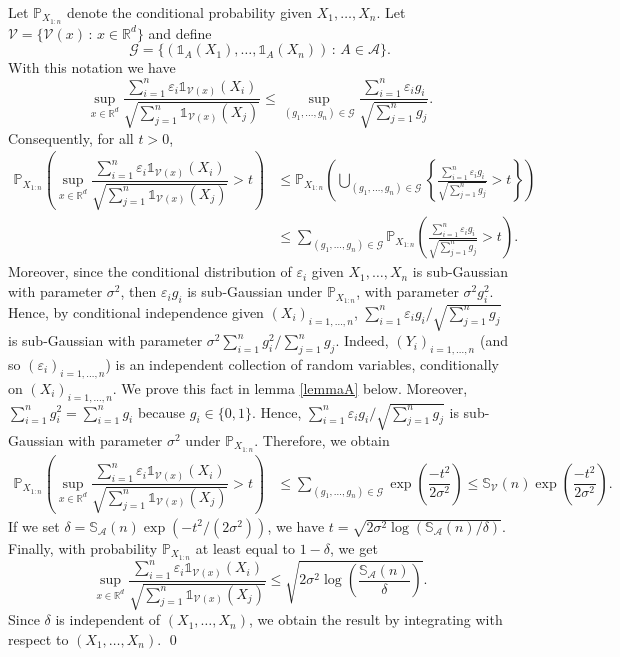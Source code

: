 \documentclass[paper=a4, fontsize=11pt]{scrartcl}
\newcommand{\pr}{\mathbb{P}}
\begin{document}
Let \( \mathbb P_{X_{1:n}} \) denote the conditional probability given \( X_1, \dots, X_n \). Let $\mathcal V = \{ \mathcal V (x) \, : \, x\in \mathbb R^d\}$ and define
$$ \mathcal G = \{ (\mathds 1 _{ A }(X_1), \dots,\mathds 1 _{ A}(X_n)) \, :\,  A \in \mathcal{A}  \}.$$
With this notation we have 
$$\sup_{x\in \mathbb R^d} \frac{\sum_{i=1}^n \varepsilon_i \mathds 1 _{ \mathcal V(x) }(X_i)}{\sqrt{\sum_{j=1}^n \mathds 1 _{ \mathcal V(x) }(X_j)}} \leq  \sup_{(g_1,\ldots, g_n) \in \mathcal G } \frac{\sum_{i=1}^n \varepsilon_i g_i }{\sqrt{ \sum_{j=1}^n g_j}}.$$
Consequently, for all $t > 0$,
\begin{align*}
   \pr_{X_{1:n}}\left(\sup_{x\in \mathbb R^d} \dfrac{\sum_{i=1}^n \varepsilon_i \mathds 1 _{ \mathcal V(x) }(X_i)}{\sqrt{\sum_{j=1}^n \mathds 1 _{ \mathcal V(x) }(X_j)}} > t  \right) 
   &\leq \pr_{X_{1:n}}\left( \bigcup_{(g_1,\ldots, g_n) \in \mathcal G }  \left\{  \frac{\sum_{i=1}^n \varepsilon_i g_i }{\sqrt{ \sum_{j=1}^n g_j}} > t \right\}  \right) \\ 
   &\leq \sum_{(g_1,\ldots, g_n) \in \mathcal G } \pr_{X_{1:n}}\left(\frac{\sum_{i=1}^n \varepsilon_i g_i}{\sqrt{ \sum_{j=1}^n g_j}} > t  \right).
\end{align*} 
Moreover, since the conditional distribution of $\varepsilon_i$ given $X_1,\ldots,X_n$ is sub-Gaussian with parameter $\sigma^2$, then  $\varepsilon_i g_i$ is sub-Gaussian under $\pr_{X_{1:n}}$, with parameter $\sigma^2 g_i^2$. Hence, by conditional independence given $(X_i)_{i = 1,\ldots, n}$, ${\sum_{i=1}^n \varepsilon_i g_i}/{\sqrt{ \sum_{j=1}^n g_j}}$ is sub-Gaussian with parameter $\sigma^2 \sum_{i=1}^n g_i^2 / \sum_{j=1}^n g_j$. Indeed, $(Y_i) _{i = 1,\ldots, n} $ (and so $(\varepsilon_i) _{i = 1,\ldots, n} $) is an independent collection of random variables, conditionally on $(X_i)_{i = 1,\ldots, n}$. We prove this fact in lemma \ref{lemmaA} below.  Moreover, $\sum_{i=1}^n g_i^2 = \sum_{i=1}^n g_i$ because $g_i\in \{ 0,1\} $. Hence, ${\sum_{i=1}^n \varepsilon_i g_i}/{\sqrt{ \sum_{j=1}^n g_j}}$ is sub-Gaussian with parameter $\sigma^2$ under $\pr_{X_{1:n}}$. Therefore, we obtain     
\begin{align*}
    \pr_{X_{1:n}}\left(\sup_{x\in \mathbb R^d} \dfrac{\sum_{i=1}^n \varepsilon_i \mathds 1 _{ \mathcal V(x) }(X_i)}{\sqrt{\sum_{j=1}^n \mathds 1 _{ \mathcal V(x) }(X_j)}} > t  \right)  &\leq \sum_{(g_1,\ldots, g_n) \in \mathcal G } \exp\left( \dfrac{-t^2}{2\sigma^2}\right)  \leq  \mathbb S_\mathcal V(n) \exp\left( \dfrac{-t^2}{2\sigma^2}\right).
\end{align*}
   If we set $\delta = \mathbb S_\mathcal A(n) \exp\left( {-t^2} /{(2\sigma^2)}\right)$, we have $t = \sqrt{2\sigma^2 \log\left({\mathbb S_\mathcal A(n)}/{\delta}\right)}$. Finally, with probability $\pr_{X_{1:n}}$ at least equal to $1 - \delta$, we get
$$\sup_{x\in \mathbb R^d} \dfrac{\sum_{i=1}^n \varepsilon_i \mathds 1 _{ \mathcal V(x) }(X_i)}{\sqrt{\sum_{j=1}^n \mathds 1 _{ \mathcal V(x) }(X_j)}}  \leq \sqrt{2 \sigma^2 \log\left( \frac{\mathbb S_{\mathcal A}(n)}{\delta} \right)}.$$
   Since $\delta$ is independent of $(X_1,\ldots,X_n)$, we obtain the result by integrating with respect to $(X_1,\ldots,X_n)$. \qed 
%
\end{document}
